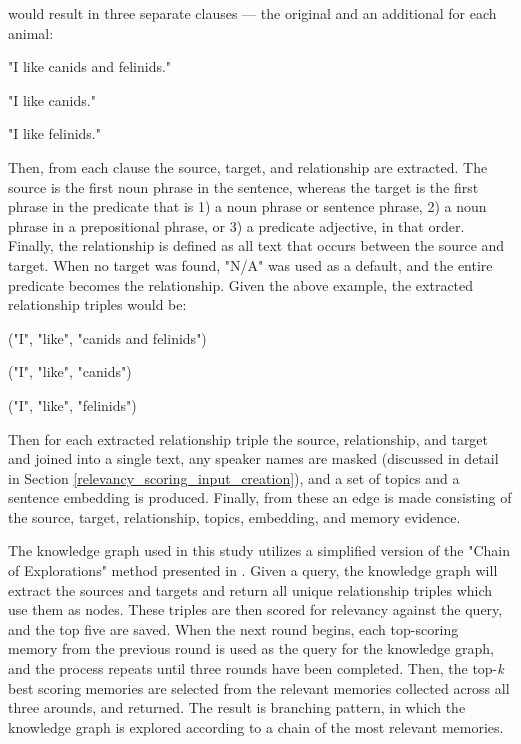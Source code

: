 \noindent would result in three separate clauses — the original and an additional for each animal:

\begin{displayquote}
"I like canids and felinids."

"I like canids."

"I like felinids."
\end{displayquote}

\noindent Then, from each clause the source, target, and relationship are extracted. The source is the first noun phrase in the sentence, whereas the target is the first phrase in the predicate that is 1) a noun phrase or sentence phrase, 2) a noun phrase in a prepositional phrase, or 3) a predicate adjective, in that order. Finally, the relationship is defined as all text that occurs between the source and target. When no target was found, "N/A" was used as a default, and the entire predicate becomes the relationship. Given the above example, the extracted relationship triples would be:

\begin{displayquote}
("I", "like", "canids and felinids")

("I", "like", "canids")

("I", "like", "felinids")
\end{displayquote}


\noindent Then for each extracted relationship triple the source, relationship, and target and joined into a single text, any speaker names are masked (discussed in detail in Section \ref{relevancy_scoring_input_creation}), and a set of topics and a sentence embedding is produced. Finally, from these an edge is made consisting of the source, target, relationship, topics, embedding, and memory evidence.

The knowledge graph used in this study utilizes a simplified version of the "Chain of Explorations" method presented in \cite{Sanmartin2024}. Given a query, the knowledge graph will extract the sources and targets and return all unique relationship triples which use them as nodes. These triples are then scored for relevancy against the query, and the top five are saved. When the next round begins, each top-scoring memory from the previous round is used as the query for the knowledge graph, and the process repeats until three rounds have been completed. Then, the top-\textit{k} best scoring memories are selected from the relevant memories collected across all three arounds, and returned. The result is branching pattern, in which the knowledge graph is explored according to a chain of the most relevant memories. 

